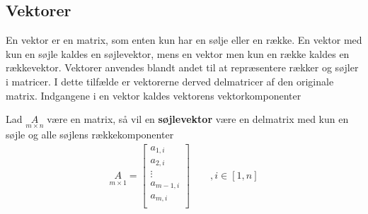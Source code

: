 \subsection{Vektorer}

En vektor er en matrix, som enten kun har en sølje eller en række. En vektor med kun en søjle kaldes en søjlevektor, mens en vektor men kun en række kaldes en rækkevektor.
Vektorer anvendes blandt andet til at repræsentere  rækker og søjler i matricer. I dette tilfælde er vektorerne derved delmatricer af den originale matrix.
Indgangene i en vektor kaldes vektorens vektorkomponenter



\begin{defn}[Søjlevektor]
Lad $\underset{m \times n}{A}$ være en matrix, så vil en \textbf{søjlevektor} være en delmatrix med kun en søjle og alle søjlens rækkekomponenter
\begin{align*}
\underset{m \times 1}{A} = 
\begin{bmatrix}
a_{1,i}\\
a_{2,i}\\
\vdots \\
a_{m-1,i}\\
a_{m,i} \\
\end{bmatrix}\qquad , i\in [1,n]%
\end{align*}
\end{defn}

